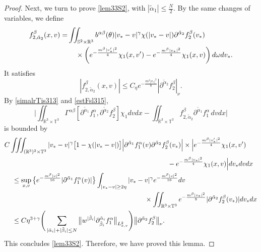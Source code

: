 \documentclass[reqno]{amsart}
\numberwithin{equation}{section}
\numberwithin{equation}{section}
\begin{document}
\begin{proof}
			Next, we turn to prove \eqref{lem33S2}, with $\left|\tilde{\alpha}_1 \right| \leq \frac{N}{2}$. By the same changes of variables, we define
			\begin{align}
				f^{\beta}_{2,\tilde{\alpha}_2}(x,v) =& \iint_{\mathbb{S}^2\times\mathbb{R}^3} b^{\alpha \beta}(\theta)|v_* - v|^\gamma \chi(|v_* - v|) \partial^{\tilde{\alpha}_2}f^{\beta}_2(v_*)\label{simalrTis313}\\
				&\hspace{0.4cm}\times \left( e^{-\frac{m^{\beta}|v_*'|^2}{4}} \chi_1(x, v') - e^{-\frac{m^{\beta}|v_*|^2}{4}} \chi_1(x, v) \right) d\omega dv_*.\notag
			\end{align}
			It satisfies
			\begin{equation}\label{estFsl315}
				|f^{\beta}_{2,\tilde{\alpha}_2}(x,v)| \le C_\eta e^{-\frac{m^{\beta}|v_*|^2}{8}} |\partial^{\tilde{\alpha}_2}f^{\beta}_2|_{\nu}.
			\end{equation}
			By \eqref{simalrTis313} and \eqref{estFsl315},
			\begin{equation*}
				\Big|\iint_{\mathbb{R}^3\times\mathbb{T}^3} \Gamma^{\alpha \beta} [\partial^{\tilde{\alpha}_1}f^{\alpha}_1, \partial^{\tilde{\alpha}_2}f^{\beta}_2] \chi_1 dv dx - \iint_{\mathbb{R}^3\times\mathbb{T}^3} f^{\beta}_{2,\tilde{\alpha}_2} \partial^{\tilde{\alpha}_1}f^{\alpha}_1\, dvdx\Big|
			\end{equation*}
			is bounded by
			\begin{align*}
				&C \iiint_{(\mathbb{R}^3)^2\times\mathbb{T}^3} |v_* - v|^\gamma \big[1 - \chi(|v_* - v|)\big]\Big|\partial^{\tilde{\alpha}_1}f^{\alpha}_1(v) \partial^{\tilde{\alpha}_2}f^{\beta}_2(v_*)\Big|\times \Big|e^{-\frac{m^{\beta}|v_*'|^2}{4}} \chi_1(x, v')\\
				&\hspace{8.5cm} - e^{-\frac{m^{\beta}|v_*|^2}{4}} \chi_1(x, v)\Big|dv_* dv dx\\
				&\hspace{0.4cm}\leq \sup_{\substack{x, v}} \big\{e^{-\frac{m^{\beta}|v|^2}{16}} |\partial^{\tilde{\alpha}_1}f^{\alpha}_1(v)|\big\} \int_{|v_* - v| \geq 2\eta} |v_* - v|^\gamma e^{-\frac{m^{\beta}|v|^2}{16}} dv\\
				&\hspace{7.3cm} \times \iint_{\mathbb{R}^3\times\mathbb{T}^3} e^{-\frac{m^{\beta}|v_*|^2}{8}} |\partial^{\tilde{\alpha}_2}f^{\beta}_2(v_*)| dv_* dx\\
				&\hspace{0.4cm}\le C \eta^{3 + \gamma} \Bigg( \sum_{| \tilde{\alpha}_i |+| \tilde{\beta}_i | \leq N} \big\| w^{| \tilde{\beta}_i |} \partial_{\tilde{\beta}_i}^{\tilde{\alpha}_i} f^{\alpha}_1\big\|_{L^{2}_{x,v}} \Bigg) \big\| \partial^{\tilde{\alpha}_2}f^{\beta}_2 \big\|_{\nu}.
			\end{align*}
			This concludes \eqref{lem33S2}. Therefore, we have proved this lemma.
		\end{proof}
	
\end{document}
